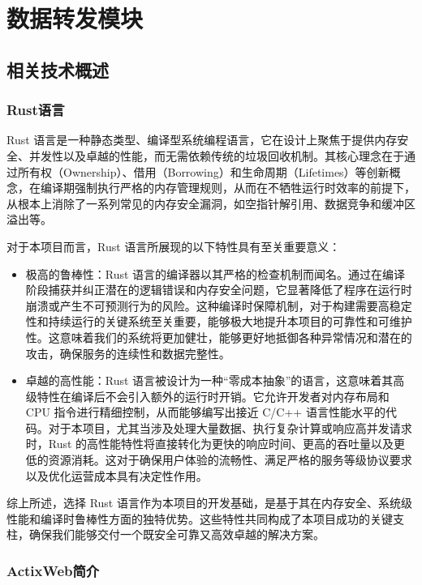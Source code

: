 \chapter{数据转发模块}

\section{相关技术概述}

\subsection{Rust语言}

Rust 语言是一种静态类型、编译型系统编程语言，它在设计上聚焦于提供内存安全、并发性以及卓越的性能，而无需依赖传统的垃圾回收机制。其核心理念在于通过所有权（Ownership）、借用（Borrowing）和生命周期（Lifetimes）等创新概念，在编译期强制执行严格的内存管理规则，从而在不牺牲运行时效率的前提下，从根本上消除了一系列常见的内存安全漏洞，如空指针解引用、数据竞争和缓冲区溢出等。

对于本项目而言，Rust 语言所展现的以下特性具有至关重要意义：

\begin{itemize}
    \item 极高的鲁棒性：Rust 语言的编译器以其严格的检查机制而闻名。通过在编译阶段捕获并纠正潜在的逻辑错误和内存安全问题，它显著降低了程序在运行时崩溃或产生不可预测行为的风险。这种编译时保障机制，对于构建需要高稳定性和持续运行的关键系统至关重要，能够极大地提升本项目的可靠性和可维护性。这意味着我们的系统将更加健壮，能够更好地抵御各种异常情况和潜在的攻击，确保服务的连续性和数据完整性。
    \item 卓越的高性能：Rust 语言被设计为一种“零成本抽象”的语言，这意味着其高级特性在编译后不会引入额外的运行时开销。它允许开发者对内存布局和 CPU 指令进行精细控制，从而能够编写出接近 C/C++ 语言性能水平的代码。对于本项目，尤其当涉及处理大量数据、执行复杂计算或响应高并发请求时，Rust 的高性能特性将直接转化为更快的响应时间、更高的吞吐量以及更低的资源消耗。这对于确保用户体验的流畅性、满足严格的服务等级协议要求以及优化运营成本具有决定性作用。
\end{itemize}

综上所述，选择 Rust 语言作为本项目的开发基础，是基于其在内存安全、系统级性能和编译时鲁棒性方面的独特优势。这些特性共同构成了本项目成功的关键支柱，确保我们能够交付一个既安全可靠又高效卓越的解决方案。

\subsection{ActixWeb简介}

